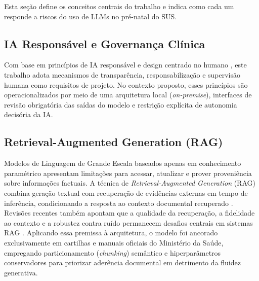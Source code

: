 \documentclass[12pt]{article}
\begin{document}
Esta seção define os conceitos centrais do trabalho e indica como cada um responde a riscos do uso de LLMs no pré-natal do SUS.

\subsection{IA Responsável e Governança Clínica}
Com base em princípios de IA responsável e design centrado no humano \cite{Shneiderman2021, Cabitza2022}, este trabalho adota mecanismos de transparência, responsabilização e supervisão humana como requisitos de projeto.
No contexto proposto, esses princípios são operacionalizados por meio de uma arquitetura local (\textit{on-premise}), interfaces de revisão obrigatória das saídas do modelo e restrição explícita de autonomia decisória da IA.

\subsection{Retrieval-Augmented Generation (RAG)}
Modelos de Linguagem de Grande Escala baseados apenas em conhecimento paramétrico apresentam limitações para acessar, atualizar e prover proveniência sobre informações factuais.
A técnica de \textit{Retrieval-Augmented Generation} (RAG) combina geração textual com recuperação de evidências externas em tempo de inferência, condicionando a resposta ao contexto documental recuperado \cite{Lewis2020RAG}.
Revisões recentes também apontam que a qualidade da recuperação, a fidelidade ao contexto e a robustez contra ruído permanecem desafios centrais em sistemas RAG \cite{Sharma2025RAGSurvey}.
Aplicando essa premissa à arquitetura, o modelo foi ancorado exclusivamente em cartilhas e manuais oficiais do Ministério da Saúde, empregando particionamento (\textit{chunking}) semântico e hiperparâmetros conservadores para priorizar aderência documental em detrimento da fluidez generativa.

\end{document}
